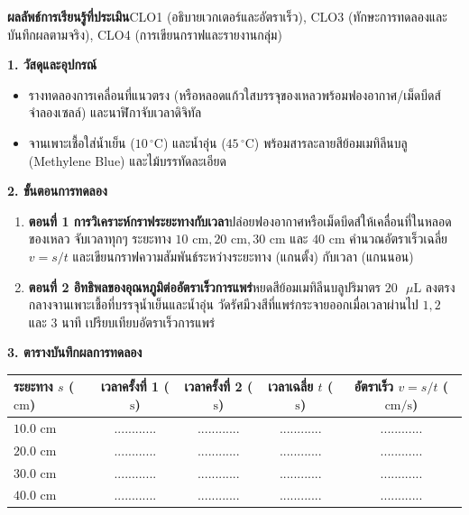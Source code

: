 \begin{labbox}
\noindent\textbf{ผลลัพธ์การเรียนรู้ที่ประเมิน}\quad CLO1 (อธิบายเวกเตอร์และอัตราเร็ว), CLO3 (ทักษะการทดลองและบันทึกผลตามจริง), CLO4 (การเขียนกราฟและรายงานกลุ่ม)

\vspace{4pt}
\noindent\textbf{1. วัสดุและอุปกรณ์}
\begin{itemize}
    \item รางทดลองการเคลื่อนที่แนวตรง (หรือหลอดแก้วใสบรรจุของเหลวพร้อมฟองอากาศ/เม็ดบีดส์จำลองเซลล์) และนาฬิกาจับเวลาดิจิทัล
    \item จานเพาะเชื้อใส่น้ำเย็น ($10\,^\circ\text{C}$) และน้ำอุ่น ($45\,^\circ\text{C}$) พร้อมสารละลายสีย้อมเมทิลีนบลู (Methylene Blue) และไม้บรรทัดละเอียด
\end{itemize}

\noindent\textbf{2. ขั้นตอนการทดลอง}
\begin{enumerate}
    \item \textbf{ตอนที่ 1 การวิเคราะห์กราฟระยะทางกับเวลา}\quad ปล่อยฟองอากาศหรือเม็ดบีดส์ให้เคลื่อนที่ในหลอดของเหลว จับเวลาทุกๆ ระยะทาง $10\text{ cm}, 20\text{ cm}, 30\text{ cm}$ และ $40\text{ cm}$ คำนวณอัตราเร็วเฉลี่ย $v = s/t$ และเขียนกราฟความสัมพันธ์ระหว่างระยะทาง (แกนตั้ง) กับเวลา (แกนนอน)
    \item \textbf{ตอนที่ 2 อิทธิพลของอุณหภูมิต่ออัตราเร็วการแพร่}\quad หยดสีย้อมเมทิลีนบลูปริมาตร $20\text{ }\mu\text{L}$ ลงตรงกลางจานเพาะเชื้อที่บรรจุน้ำเย็นและน้ำอุ่น วัดรัศมีวงสีที่แพร่กระจายออกเมื่อเวลาผ่านไป $1, 2$ และ $3$ นาที เปรียบเทียบอัตราเร็วการแพร่
\end{enumerate}

\noindent\textbf{3. ตารางบันทึกผลการทดลอง}
\begin{center}
\footnotesize\setlength{\tabcolsep}{3.5pt}
\begin{tabularx}{\linewidth}{>{\raggedright\arraybackslash}X c c c c}
\toprule
\textbf{ระยะทาง $s$ ($\text{cm}$)} & \textbf{เวลาครั้งที่ 1 ($\text{s}$)} & \textbf{เวลาครั้งที่ 2 ($\text{s}$)} & \textbf{เวลาเฉลี่ย $t$ ($\text{s}$)} & \textbf{อัตราเร็ว $v = s/t$ ($\text{cm/s}$)} \\
\midrule
$10.0\text{ cm}$ & ............ & ............ & ............ & ............ \\
$20.0\text{ cm}$ & ............ & ............ & ............ & ............ \\
$30.0\text{ cm}$ & ............ & ............ & ............ & ............ \\
$40.0\text{ cm}$ & ............ & ............ & ............ & ............ \\
\bottomrule
\end{tabularx}
\end{center}
\end{labbox}

